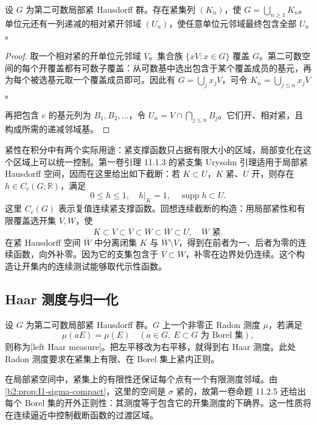 \begin{proposition}[可数紧覆盖]
\label{b2:prop:I1-sigma-compact}
设 \(G\) 为第二可数局部紧 Hausdorff 群。存在紧集列 \((K_n)\)，使 \(G=\bigcup_{n\ge1}K_n\)。单位元还有一列递减的相对紧开邻域 \((U_n)\)，使任意单位元邻域最终包含全部 \(U_n\)。
\end{proposition}
\begin{proof}
取一个相对紧的开单位元邻域 \(V\)。集合族 \(\{xV:x\in G\}\) 覆盖 \(G\)。第二可数空间的每个开覆盖都有可数子覆盖：从可数基中选出包含于某个覆盖成员的基元，再为每个被选基元取一个覆盖成员即可。因此有 \(G=\bigcup_jx_jV\)，可令 \(K_n=\bigcup_{j\le n}x_j\overline V\)。

再把包含 \(e\) 的基元列为 \(B_1,B_2,\ldots\)，令 \(U_n=V\cap\bigcap_{j\le n}B_j\)。它们开、相对紧，且构成所需的递减邻域基。
\end{proof}

紧性在积分中有两个实际用途：紧支撑函数只占据有限大小的区域，局部变化在这个区域上可以统一控制。第一卷引理 11.1.3 的紧支集 Urysohn 引理适用于局部紧 Hausdorff 空间，因而在这里给出如下截断：若 \(K\subset U\)，\(K\) 紧、\(U\) 开，则存在 \(h\in C_c(G;\mathbb R)\)，满足
\[
 0\le h\le1,\quad h|_K=1,\quad \operatorname{supp}h\subset U.
\]
这里 \(C_c(G)\) 表示复值连续紧支撑函数。回想连续截断的构造：用局部紧性和有限覆盖选开集 \(V,W\)，使
\[
 K\subset V\subset\overline V\subset W\subset\overline W\subset U,
 \quad \overline W\text{ 紧}.
\]
在紧 Hausdorff 空间 \(\overline W\) 中分离闭集 \(K\) 与 \(\overline W\setminus V\)，得到在前者为一、后者为零的连续函数，向外补零。因为它的支集包含于 \(\overline V\subset W\)，补零在边界处仍连续。这个构造让开集内的连续测试能够取代示性函数。

\subsection{Haar 测度与归一化}
\label{b2:subsec:I20102}

\begin{definition}[左、右 Haar 测度]
\label{b2:def:I1-haar}
设 \(G\) 为第二可数局部紧 Hausdorff 群。\(G\) 上一个非零正 Radon 测度 \(\mu\)，若满足
\[
 \mu(aE)=\mu(E)\quad(a\in G,\ E\subset G\text{ 为 Borel 集}),
\]
则称为[left Haar measure]。把左平移改为右平移，就得到右 Haar 测度。此处 Radon 测度要求在紧集上有限、在 Borel 集上紧内正则。
\end{definition}

在局部紧空间中，紧集上的有限性还保证每个点有一个有限测度邻域。由\cref{b2:prop:I1-sigma-compact}，这里的空间是 \(\sigma\) 紧的，故第一卷命题 11.2.5 还给出每个 Borel 集的开外正则性：其测度等于包含它的开集测度的下确界。这一性质将在连续逼近中控制截断函数的过渡区域。

